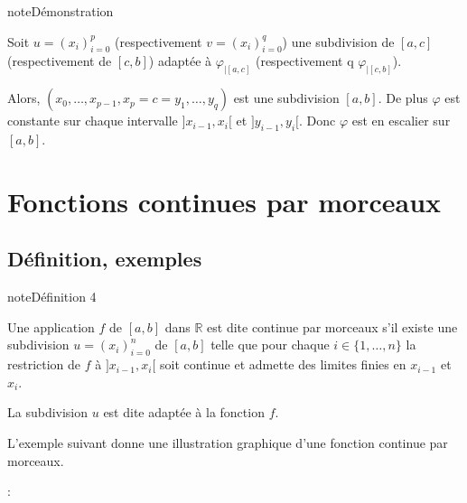 \documentclass[letterpaper,10pt,french]{sphinxmanual}
\let\sphinxpxdimen\pdfpxdimen\else\newdimen\sphinxpxdimen
\begin{document}
\begin{sphinxadmonition}{note}{Démonstration}
\begin{itemize}
\end{itemize}

\sphinxAtStartPar
Soit \(u=(x_i)_{i=0}^p\) (respectivement \(v= (x_i)_{i=0}^q\)) une subdivision de \([a, c]\) (respectivement de \([c, b]\)) adaptée à \(\varphi_{|[a, c]}\) (respectivement q \(\varphi_{|[c, b]}\)).

\sphinxAtStartPar
Alors, \((x_0, \ldots, x_{p-1}, x_p=c=y_1, \ldots, y_q)\) est une subdivision \([a, b]\). De plus \(\varphi\) est constante sur chaque intervalle \(]x_{i-1}, x_{i}[\) et \(]y_{i-1}, y_{i}[\). Donc \(\varphi\) est en escalier sur \([a, b]\).
\end{sphinxadmonition}


\section{Fonctions continues par morceaux}
\label{\detokenize{fcm:fonctions-continues-par-morceaux}}\label{\detokenize{fcm::doc}}

\subsection{Définition, exemples}
\label{\detokenize{fcm:definition-exemples}}
\begin{sphinxadmonition}{note}{Définition 4}

\sphinxAtStartPar
Une application \(f\) de \([a, b]\) dans \(\mathbb{R}\) est dite continue par morceaux s’il existe une subdivision \(u=(x_i)_{i=0}^n\) de \([a, b]\) telle que pour chaque \(i \in \{1,\ldots, n\}\) la restriction de \(f\) à \(]x_{i-1}, x_i[\) soit continue et admette des limites finies en \(x_{i-1}\) et \(x_{i}\).
\end{sphinxadmonition}

\sphinxAtStartPar
La subdivision \(u\) est dite adaptée à la fonction \(f\).

\sphinxAtStartPar
L’exemple suivant donne une illustration graphique d’une fonction continue par morceaux.

\sphinxAtStartPar
{}:

\noindent{\hspace*{\fill}\sphinxincludegraphics[width=500\sphinxpxdimen]{{fig1}.png}\hspace*{\fill}}
\end{document}

